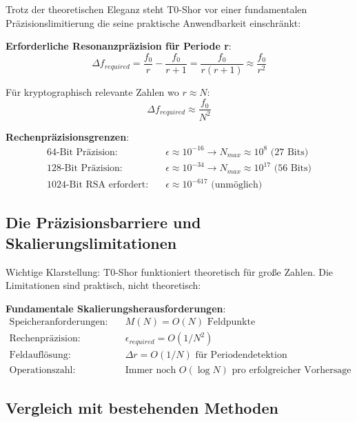 \documentclass[12pt,a4paper]{article}
\begin{document}
	Trotz der theoretischen Eleganz steht T0-Shor vor einer fundamentalen Präzisionslimitierung die seine praktische Anwendbarkeit einschränkt:
	
	\textbf{Erforderliche Resonanzpräzision für Periode r}:
	\begin{equation}
		\Delta f_{required} = \frac{f_0}{r} - \frac{f_0}{r+1} = \frac{f_0}{r(r+1)} \approx \frac{f_0}{r^2}
	\end{equation}
	
	Für kryptographisch relevante Zahlen wo $r \approx N$:
	\begin{equation}
		\Delta f_{required} \approx \frac{f_0}{N^2}
	\end{equation}
	
	\textbf{Rechenpräzisionsgrenzen}:
	\begin{align}
		\text{64-Bit Präzision}: \quad &\epsilon \approx 10^{-16} \rightarrow N_{max} \approx 10^8 \text{ (27 Bits)} \\
		\text{128-Bit Präzision}: \quad &\epsilon \approx 10^{-34} \rightarrow N_{max} \approx 10^{17} \text{ (56 Bits)} \\
		\text{1024-Bit RSA erfordert}: \quad &\epsilon \approx 10^{-617} \text{ (unmöglich)}
	\end{align}
	
	\subsection{Die Präzisionsbarriere und Skalierungslimitationen}
	
	Wichtige Klarstellung: T0-Shor funktioniert theoretisch für große Zahlen. Die Limitationen sind praktisch, nicht theoretisch:
	
	\textbf{Fundamentale Skalierungsherausforderungen}:
	\begin{align}
		\text{Speicheranforderungen}: \quad &M(N) = O(N) \text{ Feldpunkte} \\
		\text{Rechenpräzision}: \quad &\epsilon_{required} = O(1/N^2) \\
		\text{Feldauflösung}: \quad &\Delta r = O(1/N) \text{ für Periodendetektion} \\
		\text{Operationszahl}: \quad &\text{Immer noch } O(\log N) \text{ pro erfolgreicher Vorhersage}
	\end{align}
	
	\subsection{Vergleich mit bestehenden Methoden}
	
\end{document}
